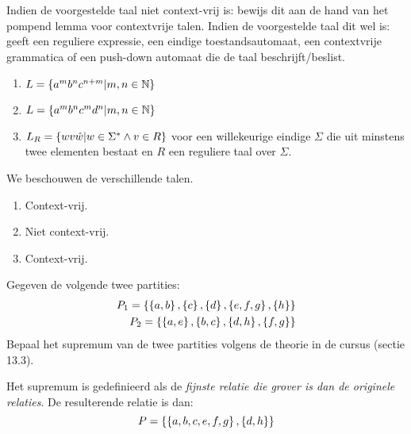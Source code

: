 \documentclass{article}
\begin{document}
\begin{question}
Indien de voorgestelde taal niet context-vrij is: bewijs dit aan de hand van het pompend lemma voor contextvrije talen.
Indien de voorgestelde taal dit wel is: geeft een reguliere expressie, een eindige toestandsautomaat, een contextvrije
grammatica of een push-down automaat die de taal beschrijft/beslist.
\begin{enumerate}
 \item $L=\left\{ a^mb^nc^{n+m}|m,n\in\mathbb{N} \right\}$
 \item $L=\left\{ a^mb^nc^md^n|m,n\in\mathbb{N} \right\}$
 \item $L_R=\left\{ wv\hat{w}|w\in\Sigma^*\wedge v\in R \right\}$ voor een willekeurige eindige $\Sigma$ die uit minstens twee
elementen bestaat en $R$ een reguliere taal over $\Sigma$.
\end{enumerate}
\end{question}
\begin{answer}
We beschouwen de verschillende talen.
\begin{enumerate}
 \item Context-vrij.
 \item Niet context-vrij.
 \item Context-vrij.
\end{enumerate}
\end{answer}
\begin{question}
Gegeven de volgende twee partities:
\begin{eqnarray}
P_1=\left\{ \left\{ a,b \right\},\left\{ c \right\},\left\{ d \right\},\left\{ e,f,g \right\},\left\{ h \right\}  \right\}\\
P_2=\left\{ \left\{ a,e \right\},\left\{ b,c \right\},\left\{ d,h \right\},\left\{ f,g \right\}  \right\}
\end{eqnarray}
Bepaal het supremum van de twee partities volgens de theorie in de cursus (sectie 13.3).
\end{question}
\begin{answer}
Het supremum is gedefinieerd als de \emph{fijnste relatie die grover is dan de originele relaties}. De resulterende relatie is dan:
\begin{equation}
P=\left\{ \left\{ a,b,c,e,f,g \right\},\left\{ d,h \right\}  \right\}
\end{equation}
\end{answer}
\end{document}
